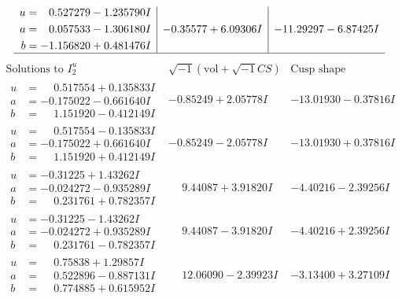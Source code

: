\documentclass[1p]{elsarticle_modified}
\theoremstyle{definition}
\newcommand{\I}{\sqrt{-1}}
\begin{document}
$$\begin{array}{c|c|c}
\begin{aligned}
u &= \phantom{-}0.527279 - 1.235790 I \\
a &= \phantom{-}0.057533 - 1.306180 I \\
b &= -1.156820 + 0.481476 I\end{aligned}
 & -0.35577 + 6.09306 I & -11.29297 - 6.87425 I\\
 \hline 
 \end{array}$$\newpage$$\begin{array}{c|c|c}  
\text{Solutions to }I^u_{2}& \I (\text{vol} + \sqrt{-1}CS) & \text{Cusp shape}\\
 \hline 
\begin{aligned}
u &= \phantom{-}0.517554 + 0.135833 I \\
a &= -0.175022 - 0.661640 I \\
b &= \phantom{-}1.151920 - 0.412149 I\end{aligned}
 & -0.85249 + 2.05778 I & -13.01930 - 0.37816 I \\ \hline\begin{aligned}
u &= \phantom{-}0.517554 - 0.135833 I \\
a &= -0.175022 + 0.661640 I \\
b &= \phantom{-}1.151920 + 0.412149 I\end{aligned}
 & -0.85249 - 2.05778 I & -13.01930 + 0.37816 I \\ \hline\begin{aligned}
u &= -0.31225 + 1.43262 I \\
a &= -0.024272 - 0.935289 I \\
b &= \phantom{-}0.231761 + 0.782357 I\end{aligned}
 & \phantom{-}9.44087 + 3.91820 I & -4.40216 - 2.39256 I \\ \hline\begin{aligned}
u &= -0.31225 - 1.43262 I \\
a &= -0.024272 + 0.935289 I \\
b &= \phantom{-}0.231761 - 0.782357 I\end{aligned}
 & \phantom{-}9.44087 - 3.91820 I & -4.40216 + 2.39256 I \\ \hline\begin{aligned}
u &= \phantom{-}0.75838 + 1.29857 I \\
a &= \phantom{-}0.522896 - 0.887131 I \\
b &= \phantom{-}0.774885 + 0.615952 I\end{aligned}
 & \phantom{-}12.06090 - 2.39923 I & -3.13400 + 3.27109 I \\ \hline\begin{aligned}

\end{aligned}
\end{array}$$
\end{document}
